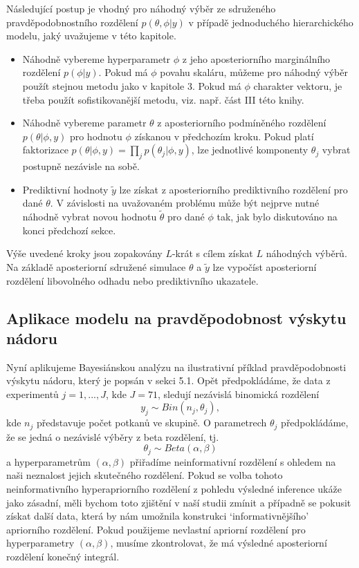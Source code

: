 Následující postup je vhodný pro náhodný výběr ze sdruženého pravděpodobnostního rozdělení $p(\theta, \phi | y)$ v případě jednoduchého hierarchického modelu, jaký uvažujeme v této kapitole.
\begin{itemize}
\item Náhodně vybereme hyperparametr $\phi$ z jeho aposteriorního marginálního rozdělení $p(\phi | y)$. Pokud má $\phi$ povahu skaláru, můžeme pro náhodný výběr použít stejnou metodu jako v kapitole 3. Pokud má $\phi$ charakter vektoru, je třeba použít sofistikovanější metodu, viz. např. část III této knihy.
\item Náhodně vybereme parametr $\theta$ z aposteriorního podmíněného rozdělení $p(\theta | \phi, y)$ pro hodnotu $\phi$ získanou v předchozím kroku. Pokud platí faktorizace $p(\theta | \phi, y) = \prod_j p(\theta_j | \phi, y)$, lze jednotlivé komponenty $\theta_j$ vybrat postupně nezávisle na sobě.
\item Prediktivní hodnoty $\tilde{y}$ lze získat z aposteriorního prediktivního rozdělení pro dané $\theta$. V závislosti na uvažovaném problému může být nejprve nutné náhodně vybrat novou hodnotu $\tilde{\theta}$ pro dané $\phi$ tak, jak bylo diskutováno na konci předchozí sekce.
\end{itemize}
Výše uvedené kroky jsou zopakovány $L$-krát s cílem získat $L$ náhodných výběrů. Na základě aposteriorní sdružené simulace $\theta$ a $\tilde{y}$ lze vypočíst aposteriorní rozdělení libovolného odhadu nebo prediktivního ukazatele.

\subsection{Aplikace modelu na pravděpodobnost výskytu nádoru}

Nyní aplikujeme Bayesiánskou analýzu na ilustrativní příklad pravděpodobnosti výskytu nádoru, který je popsán v sekci 5.1. Opět předpokládáme, že data z experimentů $j = 1, ..., J$, kde $J = 71$, sledují nezávislá binomická rozdělení
\begin{equation}
y_j \sim \textit{Bin}(n_j, \theta_j),
\end{equation}
kde $n_j$ představuje počet potkanů ve skupině. O parametrech $\theta_j$ předpokládáme, že se jedná o nezávislé výběry z beta rozdělení, tj.
\begin{equation}
\theta_j \sim \textit{Beta}(\alpha, \beta)
\end{equation}
a hyperparametrům $(\alpha, \beta)$ přiřadíme neinformativní rozdělení s ohledem na naši neznalost jejich skutečného rozdělení. Pokud se volba tohoto neinformativního hyperapriorního rozdělení z pohledu výsledné inference ukáže jako zásadní, měli bychom toto zjištění v naší studii zmínit a případně se pokusit získat další data, která by nám umožnila konstrukci `informativnějšího' apriorního rozdělení. Pokud použijeme nevlastní apriorní rozdělení pro hyperparametry $(\alpha, \beta)$, musíme zkontrolovat, že má výsledné aposteriorní rozdělení konečný integrál.

